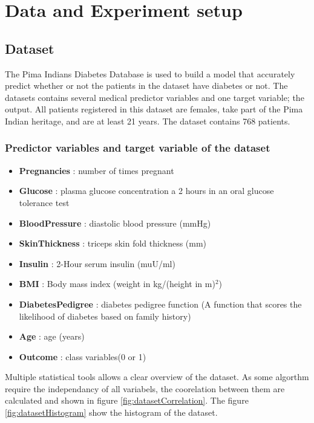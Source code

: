 \documentclass[11pt]{article}
\begin{document}
	\section{Data and Experiment setup}
		\subsection{Dataset}
	The Pima Indians Diabetes Database \cite{Pima} is used to build a model that accurately predict whether or not the patients in the dataset have diabetes or not. The datasets contains several medical predictor variables and one target variable; the output. All patients registered in this dataset are females, take part of the Pima Indian heritage, and are at least 21 years. The dataset contains 768 patients.
	\subsubsection*{Predictor variables and target variable of the dataset}
	\begin{itemize}
		\item \textbf{Pregnancies} : number of times pregnant
		\item \textbf{Glucose} : plasma glucose concentration a 2 hours in an oral glucose tolerance test
		\item \textbf{BloodPressure} : diastolic blood pressure (mmHg)
		\item \textbf{SkinThickness} : triceps skin fold thickness (mm)
		\item \textbf{Insulin} : 2-Hour serum insulin (muU/ml)
		\item \textbf{BMI} : Body mass index (weight in kg/(height in m)$^2$)
		\item \textbf{DiabetesPedigree} : diabetes pedigree function (A function that scores the likelihood of diabetes based on family history)
		\item \textbf{Age} : age (years)
		\item \textbf{Outcome} : class variables(0 or 1)
	\end{itemize}
	Multiple statistical tools allows a clear overview of the dataset. As some algorthm require the independancy of all variabels, the coorelation between them are calculated and shown in figure \ref{fig:datasetCorrelation}. The figure \ref{fig:datasetHistogram} show the histogram of the dataset. 
	
\end{document}

